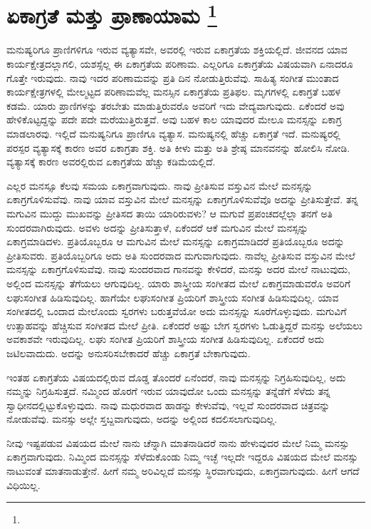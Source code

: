 
\chapter{ಏಕಾಗ್ರತೆ ಮತ್ತು ಪ್ರಾಣಾಯಾಮ \protect\footnote{}}

ಮನುಷ್ಯರಿಗೂ ಪ್ರಾಣಿಗಳಿಗೂ ಇರುವ ವ್ಯತ್ಯಾಸವೇ, ಅವರಲ್ಲಿ ಇರುವ ಏಕಾಗ್ರತೆಯ ಶಕ್ತಿಯಲ್ಲಿದೆ. ಜೀವನದ ಯಾವ ಕಾರ್ಯಕ್ಷೇತ್ರದಲ್ಲಾಗಲಿ, ಯಶಸ್ಸೆಲ್ಲ ಈ ಏಕಾಗ್ರತೆಯ ಪರಿಣಾಮ. ಎಲ್ಲರಿಗೂ ಏಕಾಗ್ರತೆಯ ವಿಷಯವಾಗಿ ಏನಾದರೂ ಗೊತ್ತೇ ಇರುವುದು. ನಾವು ಇದರ ಪರಿಣಾಮವನ್ನು ಪ್ರತಿ ದಿನ ನೋಡುತ್ತಿರುವೆವು. ಸಾಹಿತ್ಯ ಸಂಗೀತ ಮುಂತಾದ ಕಾರ್ಯಕ್ಷೇತ್ರಗಳಲ್ಲಿ ಮೇಲ್ಮಟ್ಟದ ಪರಿಣಾಮವೆಲ್ಲ ಮನಸ್ಸಿನ ಏಕಾಗ್ರತೆಯ ಪ್ರತಿಫಲ. ಮೃಗಗಳಲ್ಲಿ ಏಕಾಗ್ರತೆ ಬಹಳ ಕಡಮೆ. ಯಾರು ಪ್ರಾಣಿಗಳನ್ನು ತರಬೇತು ಮಾಡುತ್ತಿರುವರೊ ಅವರಿಗೆ ಇದು ವೇದ್ಯವಾಗುವುದು. ಏಕೆಂದರೆ ಅವು ಹೇಳಿಕೊಟ್ಟದ್ದನ್ನು ಪದೇ ಪದೇ ಮರೆಯುತ್ತಿರುತ್ತವೆ. ಅವು ಬಹಳ ಕಾಲ ಯಾವುದರ ಮೇಲೂ ಮನಸ್ಸನ್ನು ಏಕಾಗ್ರ ಮಾಡಲಾರವು. ಇಲ್ಲಿದೆ ಮನುಷ್ಯನಿಗೂ ಪ್ರಾಣಿಗೂ ವ್ಯತ್ಯಾಸ. ಮನುಷ್ಯನಲ್ಲಿ ಹೆಚ್ಚು ಏಕಾಗ್ರತೆ ಇದೆ. ಮನುಷ್ಯರಲ್ಲಿ ಪರಸ್ಪರ ವ್ಯತ್ಯಾಸಕ್ಕೆ ಕಾರಣ ಅವರ ಏಕಾಗ್ರತಾ ಶಕ್ತಿ. ಅತಿ ಕೀಳು ಮತ್ತು ಅತಿ ಶ್ರೇಷ್ಠ ಮಾನವನನ್ನು ಹೋಲಿಸಿ ನೋಡಿ. ವ್ಯತ್ಯಾಸಕ್ಕೆ ಕಾರಣ ಅವರಲ್ಲಿರುವ ಏಕಾಗ್ರತೆಯ ಹೆಚ್ಚು ಕಡಿಮೆಯಲ್ಲಿದೆ.

ಎಲ್ಲರ ಮನಸ್ಸೂ ಕೆಲವು ಸಮಯ ಏಕಾಗ್ರವಾಗುವುದು. ನಾವು ಪ್ರೀತಿಸುವ ವಸ್ತುವಿನ ಮೇಲೆ ಮನಸ್ಸನ್ನು ಏಕಾಗ್ರಗೊಳಿಸುವೆವು. ನಾವು ಯಾವ ವಸ್ತುವಿನ ಮೇಲೆ ಮನಸ್ಸನ್ನು ಏಕಾಗ್ರಗೊಳಿಸುವೆವೊ ಅದನ್ನು ಪ್ರೀತಿಸುತ್ತೇವೆ. ತನ್ನ ಮಗುವಿನ ಮುದ್ದು ಮುಖವನ್ನು ಪ್ರೀತಿಸದ ತಾಯಿ ಯಾರಿರುವಳು? ಆ ಮಗುವೆ ಪ್ರಪಂಚದಲ್ಲೆಲ್ಲಾ ತನಗೆ ಅತಿ ಸುಂದರವಾಗಿರುವುದು. ಅವಳು ಅದನ್ನು ಪ್ರೀತಿಸುತ್ತಾಳೆ, ಏಕೆಂದರೆ ಆಕೆ ಮಗುವಿನ ಮೇಲೆ ಮನಸ್ಸನ್ನು ಏಕಾಗ್ರಮಾಡಿದಳು. ಪ್ರತಿಯೊಬ್ಬರೂ ಆ ಮಗುವಿನ ಮೇಲೆ ಮನಸ್ಸನ್ನು ಏಕಾಗ್ರಮಾಡಿದರೆ ಪ್ರತಿಯೊಬ್ಬರೂ ಅದನ್ನು ಪ್ರೀತಿಸುವರು. ಪ್ರತಿಯೊಬ್ಬರಿಗೂ ಅದು ಅತಿ ಸುಂದರವಾದ ಮಗುವಾಗುವುದು. ನಾವೆಲ್ಲ ಪ್ರೀತಿಸುವ ವಸ್ತುವಿನ ಮೇಲೆ ಮನಸ್ಸನ್ನು ಏಕಾಗ್ರಗೊಳಿಸುವೆವು. ನಾವು ಸುಂದರವಾದ ಗಾನವನ್ನು ಕೇಳಿದರೆ, ಮನಸ್ಸು ಅದರ ಮೇಲೆ ನಾಟುವುದು, ಅಲ್ಲಿಂದ ಮನಸ್ಸನ್ನು ತೆಗೆಯಲು ಆಗುವುದಿಲ್ಲ. ಯಾರು ಶಾಸ್ತ್ರೀಯ ಸಂಗೀತದ ಮೇಲೆ ಏಕಾಗ್ರಮಾಡುವರೊ ಅವರಿಗೆ ಲಘುಸಂಗೀತ ಹಿಡಿಸುವುದಿಲ್ಲ. ಹಾಗೆಯೇ ಲಘುಸಂಗೀತ ಪ್ರಿಯರಿಗೆ ಶಾಸ್ತ್ರೀಯ ಸಂಗೀತ ಹಿಡಿಸುವುದಿಲ್ಲ. ಯಾವ ಸಂಗೀತದಲ್ಲಿ ಒಂದಾದ ಮೇಲೊಂದು ಸ್ವರಗಳು ಬರುತ್ತವೆಯೋ ಅದು ಮನಸ್ಸನ್ನು ಸೂರೆಗೊಳ್ಳುವುದು. ಮಗುವಿಗೆ ಉತ್ಸಾಹವನ್ನು ಹೆಚ್ಚಿಸುವ ಸಂಗೀತದ ಮೇಲೆ ಪ್ರೀತಿ. ಏಕೆಂದರೆ ಅಷ್ಟು ಬೇಗ ಸ್ವರಗಳು ಓಡುತ್ತಿದ್ದರೆ ಮನಸ್ಸು ಅಲೆಯಲು ಅವಕಾಶವೇ ಇರುವುದಿಲ್ಲ. ಲಘು ಸಂಗೀತ ಪ್ರಿಯರಿಗೆ ಶಾಸ್ತ್ರೀಯ ಸಂಗೀತ ಹಿಡಿಸುವುದಿಲ್ಲ. ಏಕೆಂದರೆ ಅದು ಜಟಿಲವಾದುದು. ಅದನ್ನು ಅನುಸರಿಸಬೇಕಾದರೆ ಹೆಚ್ಚು ಏಕಾಗ್ರತೆ ಬೇಕಾಗುವುದು.

ಇಂತಹ ಏಕಾಗ್ರತೆಯ ವಿಷಯದಲ್ಲಿರುವ ದೊಡ್ಡ ತೊಂದರೆ ಏನೆಂದರೆ, ನಾವು ಮನಸ್ಸನ್ನು ನಿಗ್ರಹಿಸುವುದಿಲ್ಲ, ಅದು ನಮ್ಮನ್ನು ನಿಗ್ರಹಿಸುತ್ತದೆ. ನಮ್ಮಿಂದ ಹೊರಗೆ ಇರುವ ಯಾವುದೋ ಒಂದು ಮನಸ್ಸನ್ನು ತನ್ನೆಡೆಗೆ ಸೆಳೆದು ತನ್ನ ಸ್ವಾಧೀನದಲ್ಲಿಟ್ಟುಕೊಳ್ಳುವುದು. ನಾವು ಮಧುರವಾದ ಹಾಡನ್ನು ಕೇಳುವೆವು, ಇಲ್ಲವೆ ಸುಂದರವಾದ ಚಿತ್ರವನ್ನು ನೋಡುವೆವು. ಮನಸ್ಸು ಅಲ್ಲೇ ಸ್ತಬ್ದವಾಗುವುದು, ಅದನ್ನು ಅಲ್ಲಿಂದ ಕದಲಿಸಲಾಗುವುದಿಲ್ಲ.

ನೀವು ಇಷ್ಟಪಡುವ ವಿಷಯದ ಮೇಲೆ ನಾನು ಚೆನ್ನಾಗಿ ಮಾತನಾಡಿದರೆ ನಾನು ಹೇಳುವುದರ ಮೇಲೆ ನಿಮ್ಮ ಮನಸ್ಸು ಏಕಾಗ್ರವಾಗುವುದು. ನಿಮ್ಮಿಂದ ಮನಸ್ಸನ್ನು ಸೆಳೆದುಕೊಂಡು ನಿಮ್ಮ ಇಚ್ಛೆ ಇಲ್ಲದೇ ಇದ್ದರೂ ವಿಷಯದ ಮೇಲೆ ಮನಸ್ಸು ನಾಟುವಂತೆ ಮಾತನಾಡುತ್ತೇನೆ. ಹೀಗೆ ನಮ್ಮ ಅರಿವಿಲ್ಲದೆ ಮನಸ್ಸು ಸ್ಥಿರವಾಗುವುದು, ಏಕಾಗ್ರವಾಗುವುದು. ಹೀಗೆ ಆಗದೆ ವಿಧಿಯಿಲ್ಲ.

